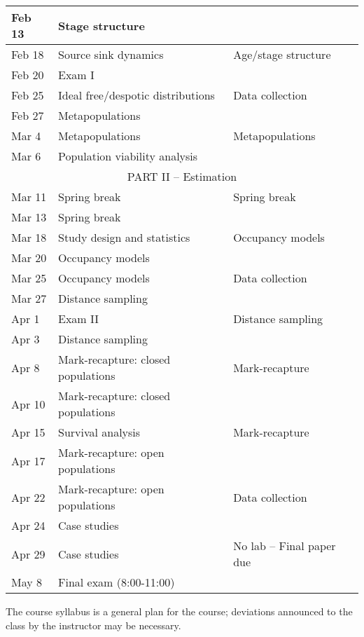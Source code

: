 \documentclass[11pt]{article}
\begin{document}
\begin{center}
\begin{tabular}[c]{lll}
Feb 13     & Stage structure                    &                                   \\
\hline 
Feb 18     & Source sink dynamics               & Age/stage structure               \\
Feb 20     & Exam I                             &                                   \\
\hline
Feb 25     & Ideal free/despotic distributions  & Data collection                   \\
Feb 27     & Metapopulations                    &                                   \\
\hline
Mar 4      & Metapopulations                    & Metapopulations                   \\
Mar 6      & Population viability analysis      &                                   \\
\hline
           \multicolumn{3}{c}{PART II -- Estimation}                                \\
\hline
Mar 11     & Spring break                       & Spring break                      \\
Mar 13     & Spring break                       &                                   \\
\hline
Mar 18     & Study design and statistics        & Occupancy models                  \\
Mar 20     & Occupancy models                   &                                   \\
\hline
Mar 25     & Occupancy models                   & Data collection                   \\
Mar 27     & Distance sampling                  &                                   \\
\hline
Apr 1      & Exam II                            & Distance sampling                 \\
Apr 3      & Distance sampling                  &                                   \\
\hline
Apr 8      & Mark-recapture: closed populations & Mark-recapture                    \\
Apr 10     & Mark-recapture: closed populations &                                   \\
\hline
Apr 15     & Survival analysis                  & Mark-recapture                    \\
Apr 17     & Mark-recapture: open populations   &                                   \\
\hline
Apr 22     & Mark-recapture: open populations   & Data collection                   \\
Apr 24     & Case studies                       &                                   \\
\hline
Apr 29     & Case studies                       & No lab -- Final paper due         \\
\hline
May  8     & Final exam (8:00-11:00)            &                                   \\ 
\hline \hline
\end{tabular}
\end{center}

The course syllabus is a general plan for the course; deviations announced to the class by the instructor may be necessary.
\end{document}
